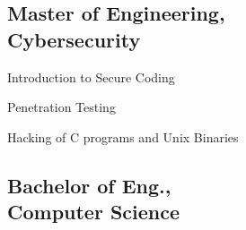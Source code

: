 \documentclass[letterpaper]{deedy-resume} %
\begin{document}
\begin{minipage}[t]{0.30\textwidth}
\subsection{Master of Engineering, \\ Cybersecurity}

\vspace{\topsep}
\begin{tightitemize}
\item Introduction to Secure Coding
\item Penetration Testing
\item Hacking of C programs and Unix Binaries
\end{tightitemize}


\sectionspace %


\subsection{Bachelor of Eng., \\ Computer Science }


\end{minipage} %
\hfill
%
%
\end{document}
